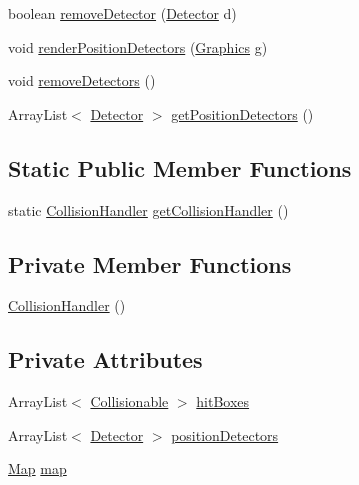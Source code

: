 \begin{DoxyCompactItemize}
\item 
boolean \mbox{\hyperlink{classentities_1_1_collision_handler_ac5666badd0093fd9c960c1a7a22ce65e}{remove\+Detector}} (\mbox{\hyperlink{interfacedetectors_1_1_detector}{Detector}} d)
\item 
void \mbox{\hyperlink{classentities_1_1_collision_handler_a8a5ec46b78904315d4ff7becc8da2f5d}{render\+Position\+Detectors}} (\mbox{\hyperlink{classorg_1_1newdawn_1_1slick_1_1_graphics}{Graphics}} g)
\item 
void \mbox{\hyperlink{classentities_1_1_collision_handler_a305659bc4ab9c4f6c228214e67f92c5b}{remove\+Detectors}} ()
\item 
Array\+List$<$ \mbox{\hyperlink{interfacedetectors_1_1_detector}{Detector}} $>$ \mbox{\hyperlink{classentities_1_1_collision_handler_aec69dac5dbf97182129420150b0b5624}{get\+Position\+Detectors}} ()
\end{DoxyCompactItemize}
\subsection*{Static Public Member Functions}
\begin{DoxyCompactItemize}
\item 
static \mbox{\hyperlink{classentities_1_1_collision_handler}{Collision\+Handler}} \mbox{\hyperlink{classentities_1_1_collision_handler_a40a5776ef3782f3bfe037085dc1c10cf}{get\+Collision\+Handler}} ()
\end{DoxyCompactItemize}
\subsection*{Private Member Functions}
\begin{DoxyCompactItemize}
\item 
\mbox{\hyperlink{classentities_1_1_collision_handler_ad94181e30c3d06d9d78d8244cc151c7a}{Collision\+Handler}} ()
\end{DoxyCompactItemize}
\subsection*{Private Attributes}
\begin{DoxyCompactItemize}
\item 
Array\+List$<$ \mbox{\hyperlink{interfaceentities_1_1_collisionable}{Collisionable}} $>$ \mbox{\hyperlink{classentities_1_1_collision_handler_a4a3eab5e53bb34f16026644c4d7c0595}{hit\+Boxes}}
\item 
Array\+List$<$ \mbox{\hyperlink{interfacedetectors_1_1_detector}{Detector}} $>$ \mbox{\hyperlink{classentities_1_1_collision_handler_ac8a71d4c1785179065bb3461aae87a1f}{position\+Detectors}}
\item 
\mbox{\hyperlink{classentities_1_1_map}{Map}} \mbox{\hyperlink{classentities_1_1_collision_handler_a2490d8412bb72d221dd9f68f97565e6f}{map}}
\end{DoxyCompactItemize}
